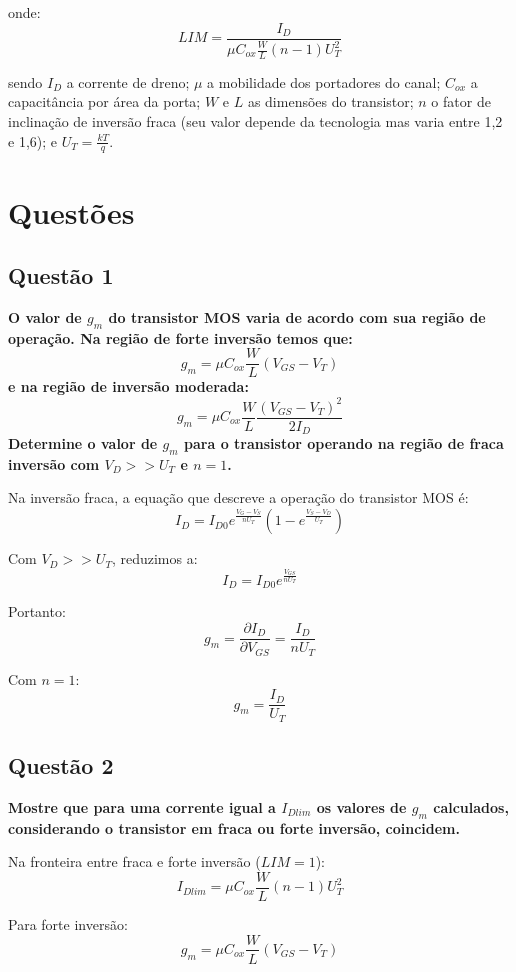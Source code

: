 \documentclass[12pt,a4paper]{article}
\begin{document}
onde:
$$LIM = \frac{I_D}{\mu C_{ox} \frac{W}{L} (n-1) U_T^2}$$

sendo $I_D$ a corrente de dreno; $\mu$ a mobilidade dos portadores do canal; $C_{ox}$ a capacitância por área da porta; $W$ e $L$ as dimensões do transistor; $n$ o fator de inclinação de inversão fraca (seu valor depende da tecnologia mas varia entre 1,2 e 1,6); e $U_T = \frac{kT}{q}$.

\newpage

\section*{Questões}

\subsection*{Questão 1}

\textbf{O valor de $g_m$ do transistor MOS varia de acordo com sua região de operação. Na região de forte inversão temos que:
$$g_m = \mu C_{ox} \frac{W}{L} (V_{GS} - V_T)$$
e na região de inversão moderada:
$$g_m = \mu C_{ox} \frac{W}{L} \frac{(V_{GS} - V_T)^2}{2I_D}$$
Determine o valor de $g_m$ para o transistor operando na região de fraca inversão com $V_D >> U_T$ e $n = 1$.}

Na inversão fraca, a equação que descreve a operação do transistor MOS é:
$$I_D = I_{D0} e^{\frac{V_G - V_S}{nU_T}} \left(1 - e^{\frac{V_S - V_D}{U_T}}\right)$$

Com $V_D >> U_T$, reduzimos a:
$$I_D = I_{D0} e^{\frac{V_{GS}}{nU_T}}$$

Portanto:
$$g_m = \frac{\partial I_D}{\partial V_{GS}} = \frac{I_D}{nU_T}$$

Com $n = 1$:
$$g_m = \frac{I_D}{U_T}$$

\subsection*{Questão 2}

\textbf{Mostre que para uma corrente igual a $I_{Dlim}$ os valores de $g_m$ calculados, considerando o transistor em fraca ou forte inversão, coincidem.}

Na fronteira entre fraca e forte inversão ($LIM = 1$):
$$I_{Dlim} = \mu C_{ox} \frac{W}{L} (n-1) U_T^2$$

Para forte inversão:
$$g_m = \mu C_{ox} \frac{W}{L} (V_{GS} - V_T)$$
\end{document}
